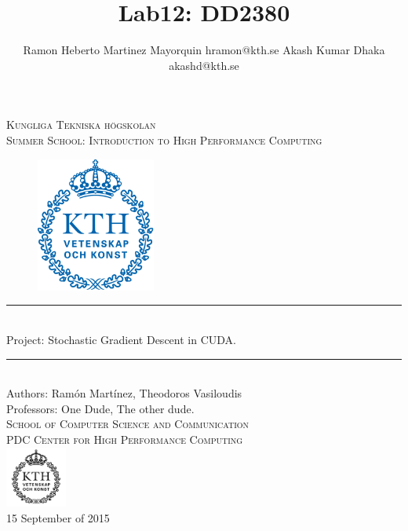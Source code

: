 \documentclass[11pt,a4paper]{article}
\title{Lab12: DD2380 }
\author{
Ramon Heberto Martinez Mayorquin  hramon@kth.se
Akash Kumar Dhaka  akashd@kth.se
}
\newcommand{\HRule}{\rule{\linewidth}{0.5mm}}
\begin{document}
\begin{titlepage}
\begin{center}

\textsc{\LARGE Kungliga Tekniska högskolan}\\[1.0cm]

\textsc{\Large Summer School: Introduction to High Performance Computing}\\[2.0cm]



\begin{figure}[H]
	\centering
 \includegraphics[width=0.35\textwidth]{Kth_logo.png}
\end{figure}
%

\HRule \\[0.4cm]
{ \huge  Project: Stochastic Gradient Descent in CUDA.
}\\[0.4cm]
\HRule \\[1.5cm]


Authors: Ram\'on  Mart\'inez, Theodoros Vasiloudis   \\
\large Professors: One Dude, The other dude.  \\ [2.5cm]

\textsc{\Large School of Computer Science and Communication \\
PDC Center for High Performance Computing}\\ [1.0cm]
\includegraphics[width=0.15\textwidth]{KTH_black.png}\\[1.5cm] %
{\large 15 September of 2015}

\end{center}
\end{titlepage}
\end{document}
